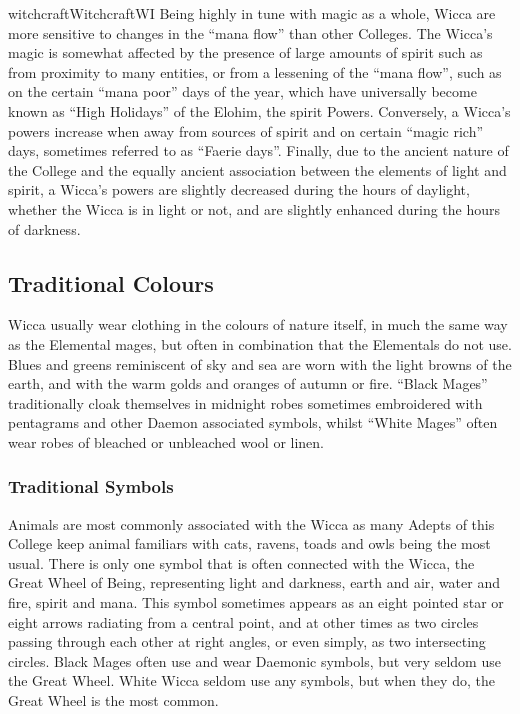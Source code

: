 \begin{College}[1.1]{witchcraft}{Witchcraft}{WI}
Being highly in tune with magic as a whole, Wicca are more sensitive
to changes in the “mana flow” than other Colleges.  The Wicca’s magic
is somewhat affected by the presence of large amounts of spirit such
as from proximity to many entities, or from a lessening of the “mana
flow”, such as on the certain “mana poor” days of the year, which have
universally become known as “High Holidays” of the Elohim, the spirit
Powers. Conversely, a Wicca’s powers increase when away from sources
of spirit and on certain “magic rich” days, sometimes referred to as
“Faerie days”.  Finally, due to the ancient nature of the College and
the equally ancient association between the elements of light and
spirit, a Wicca’s powers are slightly decreased during the hours of
daylight, whether the Wicca is in light or not, and are slightly
enhanced during the hours of darkness.

\subsection{Traditional Colours}

Wicca usually wear clothing in the colours of nature itself, in much
the same way as the Elemental mages, but often in combination that the
Elementals do not use.  Blues and greens reminiscent of sky and sea
are worn with the light browns of the earth, and with the warm golds
and oranges of autumn or fire.  “Black Mages” traditionally cloak
themselves in midnight robes sometimes embroidered with pentagrams and
other Daemon associated symbols, whilst “White Mages” often wear robes
of bleached or unbleached wool or linen.

\subsubsection{Traditional Symbols}

Animals are most commonly associated with the Wicca as many Adepts of
this College keep animal familiars with cats, ravens, toads and owls
being the most usual.  There is only one symbol that is often
connected with the Wicca, the Great Wheel of Being, representing light
and darkness, earth and air, water and fire, spirit and mana.  This
symbol sometimes appears as an eight pointed star or eight arrows
radiating from a central point, and at other times as two circles
passing through each other at right angles, or even simply, as two
intersecting circles. Black Mages often use and wear Daemonic symbols,
but very seldom use the Great Wheel.  White Wicca seldom use any
symbols, but when they do, the Great Wheel is the most common.



\end{College}
